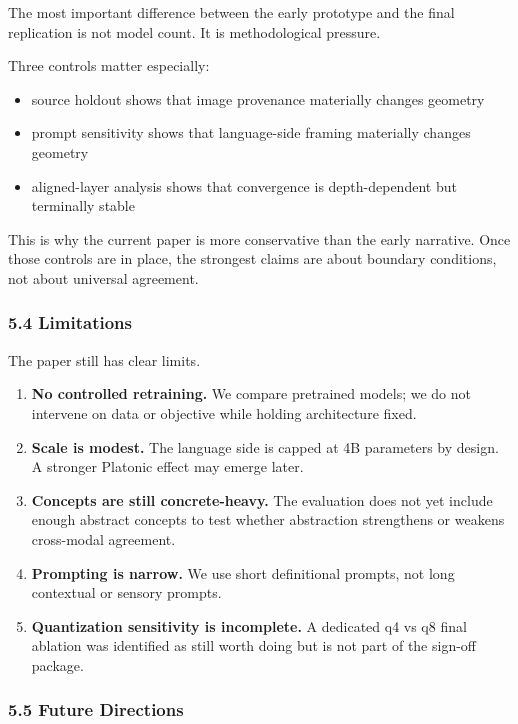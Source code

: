 \documentclass[
]{article}
\providecommand{\tightlist}{%
  \setlength{\itemsep}{0pt}\setlength{\parskip}{0pt}}
\begin{document}
The most important difference between the early prototype and the final
replication is not model count. It is methodological pressure.

Three controls matter especially:

\begin{itemize}
\tightlist
\item
  source holdout shows that image provenance materially changes geometry
\item
  prompt sensitivity shows that language-side framing materially changes
  geometry
\item
  aligned-layer analysis shows that convergence is depth-dependent but
  terminally stable
\end{itemize}

This is why the current paper is more conservative than the early
narrative. Once those controls are in place, the strongest claims are
about boundary conditions, not about universal agreement.

\subsubsection{5.4 Limitations}\label{limitations}

The paper still has clear limits.

\begin{enumerate}
\def\labelenumi{\arabic{enumi}.}
\tightlist
\item
  \textbf{No controlled retraining.} We compare pretrained models; we do
  not intervene on data or objective while holding architecture fixed.
\item
  \textbf{Scale is modest.} The language side is capped at 4B parameters
  by design. A stronger Platonic effect may emerge later.
\item
  \textbf{Concepts are still concrete-heavy.} The evaluation does not
  yet include enough abstract concepts to test whether abstraction
  strengthens or weakens cross-modal agreement.
\item
  \textbf{Prompting is narrow.} We use short definitional prompts, not
  long contextual or sensory prompts.
\item
  \textbf{Quantization sensitivity is incomplete.} A dedicated q4 vs q8
  final ablation was identified as still worth doing but is not part of
  the sign-off package.
\end{enumerate}

\subsubsection{5.5 Future Directions}\label{future-directions}
\end{document}
